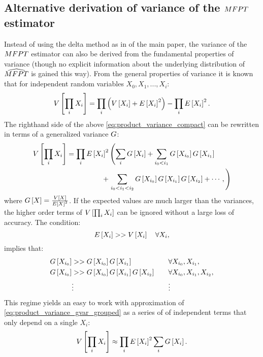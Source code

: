 %
%
%
%

\beginsupplemental

\subsection{Alternative derivation of variance of the $MFPT$ estimator}
\label{sec:sup_alt_var}
Instead of using the delta method as in  of the main paper, the variance of the  $MFPT$ estimator can also be derived from the fundamental properties of variance (though no explicit information about the underlying distribution of $\widehat{MFPT}$ is gained this way). From the general properties of variance it is known that for independent random variables $X_0, X_1, ..., X_i$:
        \begin{equation}
        \label{eq:product_variance_compact}
            V \left[ \prod_i X_i \right] = \prod_i \left(V \left[ X_i \right] + E \left[ X_i \right]^2\right) - \prod_i E \left[ X_i \right]^2.
        \end{equation}
The righthand side of the above \eqref{eq:product_variance_compact} can be rewritten in terms of a generalized variance $G$\supercite{Goodman:1962uc}:
        \begin{equation}\label{eq:product_variance_gvar_grouped}
        \begin{split}
            V \left[ \prod_i X_i \right] = \prod_i E \left[ X_i \right]^2  &\left( \sum_i G \left[ X_i \right] + \sum_{i_0 < i_1} G \left[ X_{i_0} \right] G \left[ X_{i_1} \right] \right. \\
             + & \left. \sum_{i_0 < i_1 < i_2} G \left[ X_{i_0} \right] G \left[ X_{i_1} \right] G \left[ X_{i_2} \right] + \cdots, \right)
        \end{split}
        \end{equation}
where $G \left[ X \right] = \frac{V \left[ X \right]}{E \left[ X \right]^2}$. If the expected values are much larger than the variances, the higher order terms of $V \left[ \prod_i X_i \right]$ can be ignored without a large loss of accuracy. The condition:
    \begin{equation}
    \label{eq:product_variance_approx_condition}
        E \left[ X_i \right] >> V \left[ X_i \right] \quad \forall X_i,
    \end{equation}
implies that:
    \begin{align*}
        G \left[ X_{i_0} \right] &>> G \left[ X_{i_0} \right]G \left[ X_{i_1} \right] &\quad &\forall X_{i_0}, X_{i_1}, \\
        G \left[ X_{i_0} \right] &>> G \left[ X_{i_0} \right]G \left[ X_{i_1} \right]G \left[ X_{i_2} \right] &\quad &\forall X_{i_0}, X_{i_1}, X_{i_2},\\
        & \vdots & \quad & \vdots
    \end{align*}
This regime yields an easy to work with approximation of \eqref{eq:product_variance_gvar_grouped} as a series of of independent terms that only depend on a single $X_i$:
    \begin{equation}
    \label{eq:product_variance_approx}
        V \left[ \prod_i X_i \right] \approx \prod_i E \left[ X_i \right]^2 \sum_i G \left[ X_i \right].
    \end{equation}

